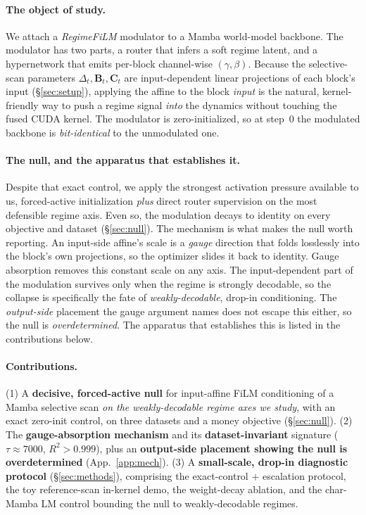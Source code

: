 \documentclass{article}
\begin{document}
\paragraph{The object of study.}
We attach a \emph{RegimeFiLM} modulator to a Mamba world-model backbone. The
modulator has two parts, a router that infers a soft regime latent, and a
hypernetwork that emits per-block channel-wise $(\gamma,\beta)$. Because the
selective-scan parameters $\Delta_t,\mathbf{B}_t,\mathbf{C}_t$ are input-dependent
linear projections of each block's input (\S\ref{sec:setup}), applying the affine
to the block \emph{input} is the natural, kernel-friendly way to push a regime
signal \emph{into} the dynamics without touching the fused CUDA kernel. The
modulator is zero-initialized, so at step~0 the modulated backbone is
\emph{bit-identical} to the unmodulated one.

\paragraph{The null, and the apparatus that establishes it.}
Despite that exact control, we apply the strongest activation pressure available
to us, forced-active initialization \emph{plus} direct router supervision on the
most defensible regime axis. Even so, the modulation decays to identity on every
objective and dataset (\S\ref{sec:null}). The mechanism is what makes the null
worth reporting. An input-side affine's scale is a \emph{gauge} direction that folds
losslessly into the block's own projections, so the optimizer slides it back to
identity. Gauge absorption removes this constant scale on any axis. The
input-dependent part of the modulation survives only when the regime is strongly
decodable, so the collapse is specifically the fate of \emph{weakly-decodable},
drop-in conditioning. The \emph{output-side} placement the gauge argument names does not
escape this either, so the null is \emph{overdetermined}. The apparatus that
establishes this is listed in the contributions below.

\paragraph{Contributions.}
(1) A \textbf{decisive, forced-active null} for input-affine FiLM conditioning of a
Mamba selective scan \emph{on the weakly-decodable regime axes we study}, with an
exact zero-init control, on three datasets and a money
objective (\S\ref{sec:null}). (2) The \textbf{gauge-absorption mechanism} and its
\textbf{dataset-invariant} signature ($\tau\approx7000$, $R^2>0.999$), plus an
\textbf{output-side placement showing the null is overdetermined}
(App.~\ref{app:mech}). (3) A \textbf{small-scale, drop-in diagnostic protocol}
(\S\ref{sec:methods}), comprising the exact-control $+$ escalation protocol, the toy
reference-scan in-kernel demo, the weight-decay ablation, and the char-Mamba LM
control bounding the null to weakly-decodable regimes.
\end{document}
